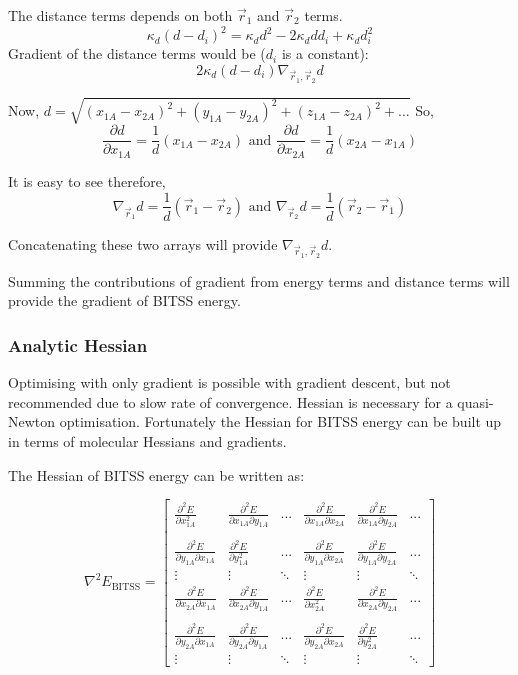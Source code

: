 \documentclass[10pt]{article}
\begin{document}
The distance terms depends on both $\vec{r}_1$ and $\vec{r}_2$ terms. $$\kappa_d(d-d_i)^2 = \kappa_d d^2 - 2 \kappa_d d d_i + \kappa_d d_i^2$$
Gradient of the distance terms would be ($d_i$ is a constant): $$2\kappa_d (d - d_i) \nabla_{\vec r_1,\vec r_2}d $$

Now, $d = \sqrt{(x_{1A}-x_{2A})^2 + (y_{1A}-y_{2A})^2 + (z_{1A} - z_{2A})^2 + ...}$ So,
$$\frac{\partial d}{\partial x_{1A}} = \frac{1}{d} (x_{1A} - x_{2A}) \text{ and }\frac{\partial d}{\partial x_{2A}} = \frac{1}{d} (x_{2A} - x_{1A})$$

It is easy to see therefore,
$$\nabla_{\vec{r}_1}d = \frac{1}{d} (\vec{r}_1 - \vec{r}_2) \text{ and }\nabla_{\vec{r}_2}d = \frac{1}{d} (\vec{r}_2 - \vec{r}_1)$$

Concatenating these two arrays will provide $\nabla_{\vec r_1,\vec r_2}d$.

Summing the contributions of gradient from energy terms and distance terms will provide the gradient of BITSS energy.

\subsubsection{Analytic Hessian}

Optimising with only gradient is possible with gradient descent, but not recommended due to slow rate of convergence. Hessian is necessary for a quasi-Newton optimisation. Fortunately the Hessian for BITSS energy can be built up in terms of molecular Hessians and gradients.

The Hessian of BITSS energy can be written as:

\begin{equation}
	\nabla^2 E_\text{BITSS} = 
	\begin{bmatrix}
		\frac{\partial^2 E}{\partial x_{1A}^2} & \frac{\partial^2 E}{\partial x_{1A}\partial y_{1A}} & ... & \frac{\partial^2 E}{\partial x_{1A}\partial x_{2A}} & \frac{\partial^2 E}{\partial x_{1A}\partial y_{2A}} & ... \\ \\
		\frac{\partial^2 E}{\partial y_{1A}\partial x_{1A}} & \frac{\partial^2 E}{\partial y_{1A}^2} & ... & \frac{\partial^2 E}{\partial y_{1A}\partial x_{2A}} & \frac{\partial^2 E}{\partial y_{1A}\partial y_{2A}} & ...\\ 
		\vdots & \vdots & \ddots & \vdots & \vdots & \ddots \\
		\frac{\partial^2 E}{\partial x_{2A}\partial x_{1A}} & \frac{\partial^2 E}{\partial x_{2A}\partial y_{1A}} & ... & \frac{\partial^2 E}{\partial x_{2A}^2} & \frac{\partial^2 E}{\partial x_{2A}\partial y_{2A}} & ... \\ \\
		\frac{\partial^2 E}{\partial y_{2A}\partial x_{1A}} & \frac{\partial^2 E}{\partial y_{2A}\partial y_{1A}} & ... & \frac{\partial^2 E}{\partial y_{2A}\partial x_{2A}} & \frac{\partial^2 E}{\partial y_{2A}^2} & ... \\
		\vdots & \vdots & \ddots & \vdots & \vdots & \ddots
	\end{bmatrix} \label{eqn:bitss-hess}
\end{equation}
\end{document}
